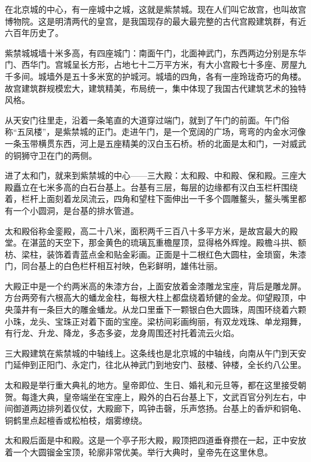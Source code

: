 \documentclass[12pt,UTF-8,openany]{ctexbook}
\begin{document}
\begin{large}
    
    在北京城的中心，有一座城中之城，这就是紫禁城。现在人们叫它故宫，也叫故宫博物院。这是明清两代的皇宫，是我国现存的最大最完整的古代宫殿建筑群，有近六百年历史了。
    
    紫禁城城墙十米多高，有四座城门：南面午门，北面神武门，东西两边分别是东华门、西华门。宫城呈长方形，占地七十二万平方米，有大小宫殿七十多座、房屋九千多间。城墙外是五十多米宽的护城河。城墙的四角，各有一座玲珑奇巧的角楼。故宫建筑群规模宏大，建筑精美，布局统一，集中体现了我国古代建筑艺术的独特风格。
    
    从天安门往里走，沿着一条笔直的大道穿过端门，就到了午门的前面。午门俗称“五凤楼”，是紫禁城的正门。走进午门，是一个宽阔的广场，弯弯的内金水河像一条玉带横贯东西，河上是五座精美的汉白玉石桥。桥的北面是太和门，一对威武的铜狮守卫在门的两侧。
    
    进了太和门，就来到紫禁城的中心——三大殿：太和殿、中和殿、保和殿。三座大殿矗立在七米多高的白石台基上。台基有三层，每层的边缘都有汉白玉栏杆围绕着，栏杆上面刻着龙凤流云，四角和望柱下面伸出一千多个圆雕鳌头，鳌头嘴里都有一个小圆洞，是台基的排水管道。
    
    太和殿俗称金銮殿，高二十八米，面积两千三百八十多平方米，是故宫最大的殿堂。在湛蓝的天空下，那金黄色的琉璃瓦重檐屋顶，显得格外辉煌。殿檐斗拱、额枋、梁柱，装饰着青蓝点金和贴金彩画。正面是十二根红色大圆柱，金琐窗，朱漆门，同台基上的白色栏杆相互衬映，色彩鲜明，雄伟壮丽。
    
    大殿正中是一个约两米高的朱漆方台，上面安放着金漆雕龙宝座，背后是雕龙屏。方台两旁有六根高大的蟠龙金柱，每根大柱上都盘绕着矫健的金龙。仰望殿顶，中央藻井有一条巨大的雕金蟠龙。从龙口里垂下一颗银白色大圆珠，周围环绕着六颗小珠，龙头、宝珠正对着下面的宝座。梁枋间彩画绚丽，有双龙戏珠、单龙翔舞，有行龙、升龙、降龙，多态多姿，龙身周围还衬托着流云火焰。
    
    三大殿建筑在紫禁城的中轴线上。这条线也是北京城的中轴线，向南从午门到天安门延伸到正阳门、永定门，往北从神武门到地安门、鼓楼、钟楼，全长约八公里。
    
    太和殿是举行重大典礼的地方。皇帝即位、生日、婚礼和元旦等，都在这里接受朝贺。每逢大典，皇帝端坐在宝座上，殿外的白石台基上下，文武百官分列左右，中间御道两边排列着仪仗，大殿廊下，鸣钟击磬，乐声悠扬。台基上的香炉和铜龟、铜鹤里点起檀香或松柏枝，烟雾缭绕。
    
    太和殿后面是中和殿。这是一个亭子形大殿，殿顶把四道垂脊攒在一起，正中安放着一个大圆镏金宝顶，轮廓非常优美。举行大典时，皇帝先在这里休息。
    

\end{large}
\end{document}
